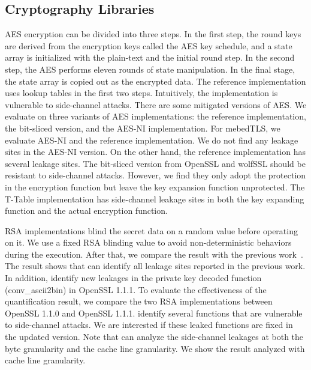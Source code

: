 \subsection{Cryptography Libraries}
AES encryption can be divided into three steps. In the first step, the round keys are derived from the encryption keys called the AES key schedule, and a state array is initialized with the plain-text and the initial round step. In the second step, the AES performs eleven rounds of state manipulation. In the final stage, the state array is copied out as the encrypted data.
The reference implementation uses lookup tables in the first two steps. Intuitively, the implementation is vulnerable to side-channel attacks. There are some mitigated versions of AES. We evaluate \ctool{} on three variants of AES implementations: the reference implementation, the bit-sliced version, and the AES-NI implementation.
For mebedTLS, we evaluate AES-NI and the reference implementation. We do not find any leakage sites in the AES-NI version. On the other hand, the reference implementation has several leakage sites. The bit-sliced version from OpenSSL and wolfSSL should be resistant to side-channel attacks. However, we find they only adopt the protection in the encryption function but leave the key expansion function unprotected. The T-Table implementation has side-channel leakage sites in both the key expanding function and the actual encryption function. 

RSA implementations blind the secret data on a random value before operating on it. We use a fixed RSA blinding value to avoid non-deterministic behaviors during the execution. After that, we compare the result with the previous work~\cite{bao2021abacus,203878}. The result shows that \ctool{} can identify all leakage sites reported in the previous work. In addition, \ctool{} identify new leakages in the private key decoded function (\textsf{conv\_ascii2bin}) in OpenSSL 1.1.1.  To evaluate the effectiveness of the quantification result, we compare the two RSA implementations between OpenSSL 1.1.0 and OpenSSL 1.1.1.  \ctool{} identify several functions that are vulnerable to side-channel attacks. We are interested if these leaked functions are fixed in the updated version.
Note that \ctool{} can analyze the side-channel leakages at both the byte granularity and the cache line granularity. We show the result analyzed with cache line granularity. 

